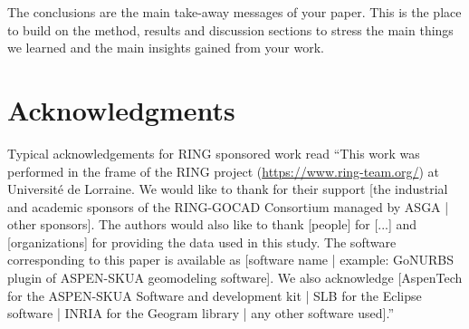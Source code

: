 \documentclass[preprint]{ring}
\begin{document}
The conclusions are the main take-away messages of your paper. This is the place to build on the method, results and discussion sections to stress the main things we learned and the main insights gained from your work. 

\section*{Acknowledgments}

Typical acknowledgements for RING sponsored work read ``This work was performed
in the frame of the RING project (\url{https://www.ring-team.org/})
at Université de Lorraine. We would like to thank for their support [the
industrial and academic sponsors of the RING-GOCAD Consortium managed by ASGA |
other sponsors]. The authors would also like to thank [people] for [...] and
[organizations] for providing the data used in this study. The software
corresponding to this paper is available as [software name | example: GoNURBS
plugin of ASPEN-SKUA geomodeling software]. We also acknowledge [AspenTech for the ASPEN-SKUA Software and development kit | SLB for the Eclipse software | INRIA for the Geogram library | any other software used].''


\end{document}
